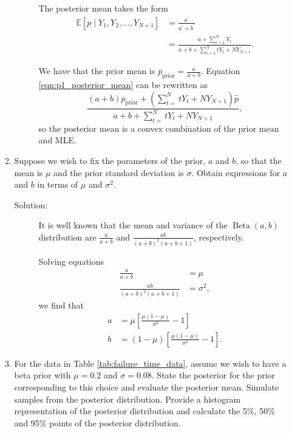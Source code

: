 \documentclass[letterpaper,11pt]{article}
\begin{document}
\begin{enumerate}
\begin{enumerate}
\begin{description}
      The posterior mean takes the form
      \begin{align}
        \mathbb{E}\left[
        p \mid Y_1,Y_2,\ldots,Y_{N+1}
        \right]
        &= \frac{a^\prime}{a^\prime + b^\prime}
          \nonumber \\
        &= \frac{a + \sum_{t=1}^N Y_t}
          {a + b + \sum_{t=1}^N tY_t + NY_{N+1}}. \label{eqn:p1_posterior_mean}
      \end{align}

      We have that the prior mean is
      $\overline{p}_{\mathrm{prior}} = \frac{a}{a + b}$.  Equation
      \ref{eqn:p1_posterior_mean} can be rewritten as
      \begin{equation}
        \boxed{
        \frac{
          \left(a + b\right)
          \overline{p}_{\mathrm{prior}}
          +
          \left(
            \sum_{t=}^N tY_t + NY_{N+1}
          \right)
          \hat{p}}
          {a + b + \sum_{t=}^N tY_t + NY_{N+1}},}
        \label{eqn:p1_posterior_mean_sum}
      \end{equation}
      so the posterior mean is a convex combination of the prior mean and MLE.
    \end{description}
  \item Suppose we wish to fix the parameters of the prior, $a$ and $b$, so that
    the mean is $\mu$ and the prior standard deviation is $\sigma$. Obtain
    expressions for $a$ and $b$ in terms of $\mu$ and $\sigma^2$.
    \begin{description}
    \item[Solution:] It is well known that the mean and variance of the
      $\operatorname{Beta}\left(a,b\right)$ distribution are $\frac{a}{a+b}$ and
      $\frac{ab}{(a+b)^2(a+b+1)}$, respectively.

      Solving equations
      \begin{align*}
        \frac{a}{a + b}
        &= \mu \\
        \frac{ab}{(a+b)^2(a+b+1)} &= \sigma^2,
      \end{align*}
      we find that
      \begin{align}
        a
        &= \mu\left[
          \frac{\mu\left(1 - \mu\right)}{\sigma^2} - 1
          \right]
          \label{eqn:p1_a} \\
        b
        &=  \left(1 - \mu\right)\left[
          \frac{\mu\left(1 - \mu\right)}{\sigma^2} - 1
          \right].
          \label{eqn:p1_b}
      \end{align}
    \end{description}
  \item For the data in Table \ref{tab:failure_time_data}, assume we wish to
    have a beta prior with $\mu = 0.2$ and $\sigma = 0.08$. State the posterior
    for the prior corresponding to this choice and evaluate the posterior
    mean. Simulate samples from the posterior distribution. Provide a histogram
    representation of the posterior distribution and calculate the 5\%, 50\% and
    95\% points of the posterior distribution.


\end{enumerate}
\end{enumerate}
\end{document}
